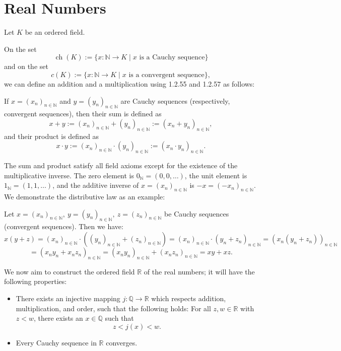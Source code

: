 \section{Real Numbers}

Let \( K \) be an ordered field.

On the set
		\[
			\operatorname{ch}(K) := \{ x : \mathbb{N} \to K \mid x \text{ is a Cauchy sequence} \}
		\]
		and on the set
		\[
			c(K) := \{ x : \mathbb{N} \to K \mid x \text{ is a convergent sequence} \},
		\]
		we can define an addition and a multiplication using 1.2.55 and 1.2.57 as follows:

		If \( x = (x_n)_{n \in \mathbb{N}} \) and \( y = (y_n)_{n \in \mathbb{N}} \) are Cauchy sequences (respectively, convergent sequences), then their sum is defined as
		\[
			x + y := (x_n)_{n \in \mathbb{N}} + (y_n)_{n \in \mathbb{N}} := (x_n + y_n)_{n \in \mathbb{N}},
		\]
		and their product is defined as
		\[
			x \cdot y := (x_n)_{n \in \mathbb{N}} \cdot (y_n)_{n \in \mathbb{N}} := (x_n \cdot y_n)_{n \in \mathbb{N}}.
		\]

The sum and product satisfy all field axioms except for the existence of the multiplicative inverse.
The zero element is \( 0_{\mathbb{N}} = (0, 0, \ldots) \), the unit element is \( 1_{\mathbb{N}} = (1, 1, \ldots) \), and the additive inverse of \( x = (x_n)_{n \in \mathbb{N}} \) is \( -x = (-x_n)_{n \in \mathbb{N}} \).
We demonstrate the distributive law as an example:

Let \( x = (x_n)_{n \in \mathbb{N}},\ y = (y_n)_{n \in \mathbb{N}},\ z = (z_n)_{n \in \mathbb{N}} \) be Cauchy sequences (convergent sequences). Then we have:
\[
	x(y + z) = (x_n)_{n \in \mathbb{N}} \cdot \left( (y_n)_{n \in \mathbb{N}} + (z_n)_{n \in \mathbb{N}} \right)
	= (x_n)_{n \in \mathbb{N}} \cdot (y_n + z_n)_{n \in \mathbb{N}}
	= (x_n (y_n + z_n))_{n \in \mathbb{N}}
\]
\[
	= (x_n y_n + x_n z_n)_{n \in \mathbb{N}}
	= (x_n y_n)_{n \in \mathbb{N}} + (x_n z_n)_{n \in \mathbb{N}}
	= xy + xz.
\]

We now aim to construct the ordered field \( \mathbb{R} \) of the real numbers;
it will have the following properties:

\begin{itemize}[label=\(-\)]
	\item There exists an injective mapping \( j : \mathbb{Q} \to \mathbb{R} \) which respects addition, multiplication, and order, such that the following holds:
		For all \( z, w \in \mathbb{R} \) with \( z < w \), there exists an \( x \in \mathbb{Q} \) such that
		\[
			z < j(x) < w.
		\]

	\item Every Cauchy sequence in \( \mathbb{R} \) converges.

\end{itemize}

